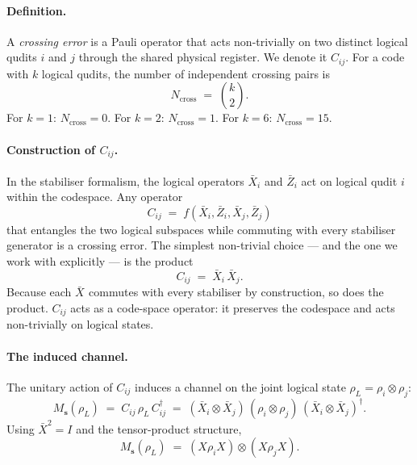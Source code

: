 \documentclass[11pt,a4paper]{article}
\newcommand{\Ms}{M_{\mathbf{s}}}
\newcommand{\Lx}[1]{\bar{X}_{#1}}
\newcommand{\Lz}[1]{\bar{Z}_{#1}}
\begin{document}
\paragraph{Definition.}
A \emph{crossing error} is a Pauli operator that acts non-trivially on two distinct logical qudits $i$ and $j$ through the shared physical register. We denote it $C_{ij}$. For a code with $k$ logical qudits, the number of independent crossing pairs is
\begin{equation}
  N_{\mathrm{cross}} \;=\; \binom{k}{2}.
  \label{eq:Ncross}
\end{equation}
For $k=1$: $N_{\mathrm{cross}}=0$. For $k=2$: $N_{\mathrm{cross}}=1$. For $k=6$: $N_{\mathrm{cross}}=15$.

\paragraph{Construction of $C_{ij}$.}
In the stabiliser formalism, the logical operators $\Lx{i}$ and $\Lz{i}$ act on logical qudit $i$ within the codespace. Any operator
\begin{equation}
  C_{ij} \;=\; f\!\left(\Lx{i},\Lz{i},\Lx{j},\Lz{j}\right)
\end{equation}
that entangles the two logical subspaces while commuting with every stabiliser generator is a crossing error. The simplest non-trivial choice --- and the one we work with explicitly --- is the product
\begin{equation}
  C_{ij} \;=\; \Lx{i}\,\Lx{j}.
  \label{eq:Cij_simple}
\end{equation}
Because each $\Lx{}$ commutes with every stabiliser by construction, so does the product. $C_{ij}$ acts as a code-space operator: it preserves the codespace and acts non-trivially on logical states.

\paragraph{The induced channel.}
The unitary action of $C_{ij}$ induces a channel on the joint logical state $\rho_L=\rho_i\otimes\rho_j$:
\begin{equation}
  \Ms(\rho_L) \;=\; C_{ij}\,\rho_L\,C_{ij}^{\dagger}
  \;=\; (\Lx{i}\otimes\Lx{j})\,(\rho_i\otimes\rho_j)\,(\Lx{i}\otimes\Lx{j})^{\dagger}.
  \label{eq:channel}
\end{equation}
Using $\Lx{}^2=I$ and the tensor-product structure,
\begin{equation}
  \Ms(\rho_L) \;=\; (X\rho_i X)\otimes(X\rho_j X).
  \label{eq:channel_action}
\end{equation}
\end{document}
